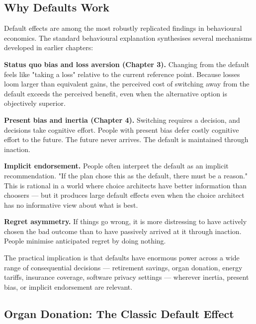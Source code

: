\documentclass[12pt, letterpaper]{article}
\begin{document}
\subsection{Why Defaults Work}


Default effects are among the most robustly replicated findings in behavioural economics. The standard behavioural explanation synthesises several mechanisms developed in earlier chapters:

\textbf{Status quo bias and loss aversion (Chapter 3).} Changing from the default feels like "taking a loss" relative to the current reference point. Because losses loom larger than equivalent gains, the perceived cost of switching away from the default exceeds the perceived benefit, even when the alternative option is objectively superior.

\textbf{Present bias and inertia (Chapter 4).} Switching requires a decision, and decisions take cognitive effort. People with present bias defer costly cognitive effort to the future. The future never arrives. The default is maintained through inaction.

\textbf{Implicit endorsement.} People often interpret the default as an implicit recommendation. "If the plan chose this as the default, there must be a reason." This is rational in a world where choice architects have better information than choosers --- but it produces large default effects even when the choice architect has no informative view about what is best.

\textbf{Regret asymmetry.} If things go wrong, it is more distressing to have actively chosen the bad outcome than to have passively arrived at it through inaction. People minimise anticipated regret by doing nothing.

The practical implication is that defaults have enormous power across a wide range of consequential decisions --- retirement savings, organ donation, energy tariffs, insurance coverage, software privacy settings --- wherever inertia, present bias, or implicit endorsement are relevant.


\subsection{Organ Donation: The Classic Default Effect}
\end{document}
